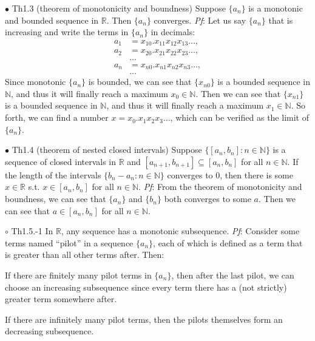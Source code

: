 \documentclass{article}
\begin{document}
\begin{Th}{$\bullet$ Th1.3 (theorem of monotonicity and boundness)}
    Suppose $\{a_n\}$ is a monotonic and bounded sequence in $\mathbb{R}$. Then $\{a_n\}$ converges.
    \tcblower
    \textit{Pf}: Let us say $\{a_n\}$ that is increasing and write the terms in $\{a_n\}$ in decimals:
    $$
    \begin{aligned}
        a_1&=x_{10}.x_{11}x_{12}x_{13}\dots,\\
        a_2&=x_{20}.x_{21}x_{22}x_{23}\dots,\\
        &\dots\\
        a_n&=x_{n0}.x_{n1}x_{n2}x_{n3}\dots,\\
        &\dots
    \end{aligned}
    $$
    Since monotonic $\{a_n\}$ is bounded, we can see that $\{x_{n0}\}$ is a bounded sequence in $\mathbb{N}$, and thus it will finally reach a maximum $x_0\in\mathbb{N}$. Then we can see that $\{x_{n1}\}$ is a bounded sequence in $\mathbb{N}$, and thus it will finally reach a maximum $x_1\in\mathbb{N}$. So forth, we can find a number $x = x_0.x_1x_2x_3\dots$, which can be verified as the limit of $\{a_n\}$.
\end{Th}

\begin{Th}{$\bullet$ Th1.4 (theorem of nested closed intervals)}
    Suppose $\{[a_n, b_n]: n\in\mathbb{N}\}$ is a sequence of closed intervals in $\mathbb{R}$ and $[a_{n+1}, b_{n+1}]\subseteq [a_n, b_n]$ for all $n\in\mathbb{N}$. If the length of the intervals $\{b_n-a_n: n\in\mathbb{N}\}$ converges to $0$, then there is some $x\in\mathbb{R}$ s.t. $x\in[a_n, b_n]$ for all $n\in\mathbb{N}$.
    \tcblower
    \textit{Pf}: From the theorem of monotonicity and boundness, we can see that $\{a_n\}$ and $\{b_n\}$ both converges to some $a$. Then we can see that $a\in[a_n, b_n]$ for all $n\in\mathbb{N}$.
\end{Th}

\begin{Th}{$\circ$ Th1.5.-1}
    In $\mathbb{R}$, any sequence has a monotonic subsequence.
    \tcblower
    \textit{Pf}: Consider some terms named ``pilot'' in a sequence $\{a_n\}$, each of which is defined as a term that is greater than all other terms after. Then:
    \begin{compactitem}
        \item If there are finitely many pilot terms in $\{a_n\}$, then after the last pilot, we can choose an increasing subsequence since every term there has a (not strictly) greater term somewhere after.
        \item If there are infinitely many pilot terms, then the pilots themselves form an decreasing subsequence.
    \end{compactitem}
\end{Th}
\end{document}
